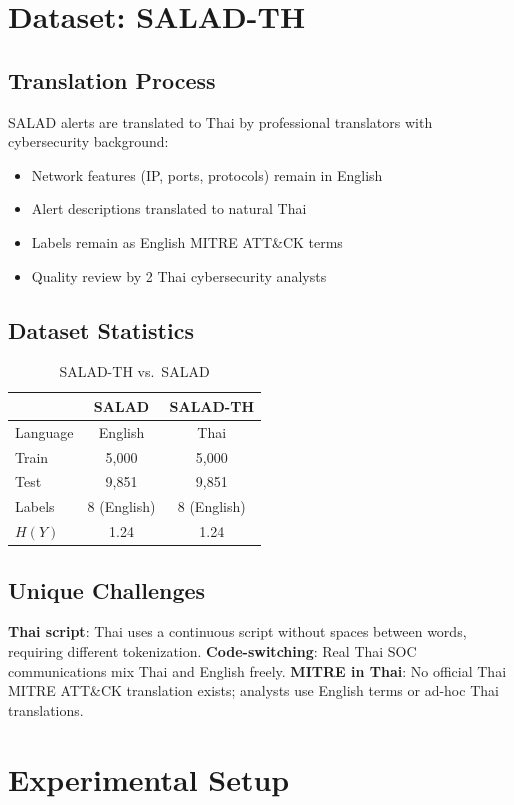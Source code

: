 \documentclass[journal]{IEEEtran}
\begin{document}
\section{Dataset: SALAD-TH}

\subsection{Translation Process}
SALAD alerts are translated to Thai by professional translators with cybersecurity background:
\begin{itemize}
\item Network features (IP, ports, protocols) remain in English
\item Alert descriptions translated to natural Thai
\item Labels remain as English MITRE ATT\&CK terms
\item Quality review by 2 Thai cybersecurity analysts
\end{itemize}

\subsection{Dataset Statistics}
\begin{table}[!ht]
\centering\caption{SALAD-TH vs.\ SALAD}
\begin{tabular}{lcc}
\toprule & \textbf{SALAD} & \textbf{SALAD-TH} \\
\midrule
Language & English & Thai \\
Train & 5,000 & 5,000 \\
Test & 9,851 & 9,851 \\
Labels & 8 (English) & 8 (English) \\
$H(Y)$ & 1.24 & 1.24 \\
\bottomrule
\end{tabular}
\end{table}

\subsection{Unique Challenges}
\textbf{Thai script}: Thai uses a continuous script without spaces between words, requiring different tokenization. \textbf{Code-switching}: Real Thai SOC communications mix Thai and English freely. \textbf{MITRE in Thai}: No official Thai MITRE ATT\&CK translation exists; analysts use English terms or ad-hoc Thai translations.

\section{Experimental Setup}
\end{document}
